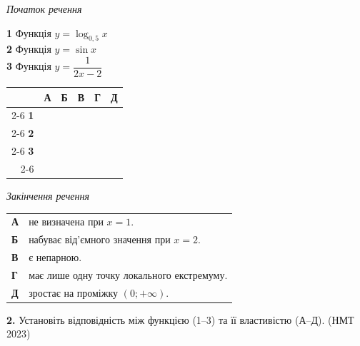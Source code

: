 \documentclass[14pt]{extarticle}
\newcommand{\nmtyear}[1]{\hfill{\small\color{yearcolor}(НМТ #1)}}
\begin{document}
\noindent
\begin{minipage}[t]{0.40\textwidth}
    \textit{Початок речення} \par \vspace{0.2cm}
    \textbf{1} \quad Функція $y = \log_{0{,}5} x$ \\[0.2cm]
    \textbf{2} \quad Функція $y = \sin x$ \\[0.2cm]
    \textbf{3} \quad Функція $y = \dfrac{1}{2x-2}$
    
    \vspace{0.5cm}
    
    \begingroup
    \setlength{\tabcolsep}{4pt} %
    \renewcommand{\arraystretch}{1.2} %
    \small %
    \begin{tabular}{r|c|c|c|c|c|}
         \multicolumn{1}{c}{} & \multicolumn{1}{c}{\textbf{А}} & \multicolumn{1}{c}{\textbf{Б}} & \multicolumn{1}{c}{\textbf{В}} & \multicolumn{1}{c}{\textbf{Г}} & \multicolumn{1}{c}{\textbf{Д}} \\ \cline{2-6}
         \textbf{1} & & & & & \\ \cline{2-6}
         \textbf{2} & & & & & \\ \cline{2-6}
         \textbf{3} & & & & & \\ \cline{2-6}
    \end{tabular}
    \endgroup
\end{minipage}%
\hfill
\begin{minipage}[t]{0.55\textwidth}
    \textit{Закінчення речення} \par \vspace{0.2cm}
    \begin{tabular}{ll}
    \textbf{А} & не визначена при $x=1$. \\
    \textbf{Б} & набуває від’ємного значення при $x=2$. \\
    \textbf{В} & є непарною. \\
    \textbf{Г} & має лише одну точку локального екстремуму. \\
    \textbf{Д} & зростає на проміжку $(0; +\infty)$. \\
    \end{tabular}
\end{minipage}

\vspace{0.7cm}

\noindent\textbf{2.} Установіть відповідність між функцією (1--3) та її властивістю (А--Д). \nmtyear{2023}
\end{document}
